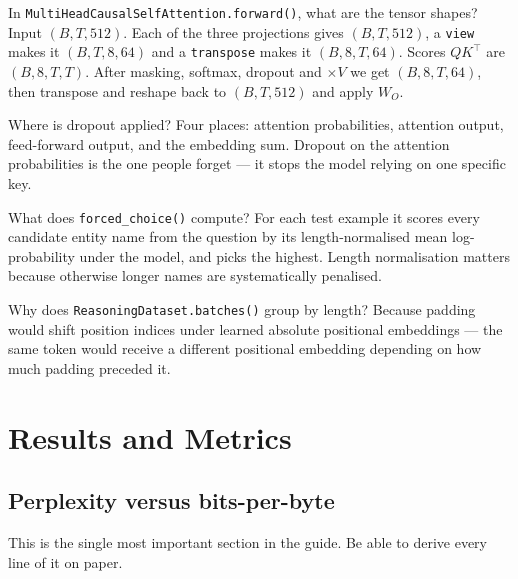\documentclass[11pt]{report}
\begin{document}
\begin{qabox}{In \texttt{MultiHeadCausalSelfAttention.forward()}, what are the tensor shapes?}
Input $(B, T, 512)$. Each of the three projections gives $(B, T, 512)$, a
\texttt{view} makes it $(B, T, 8, 64)$ and a \texttt{transpose} makes it
$(B, 8, T, 64)$. Scores $QK^{\top}$ are $(B, 8, T, T)$. After masking, softmax,
dropout and $\times V$ we get $(B, 8, T, 64)$, then transpose and reshape back
to $(B, T, 512)$ and apply $W_O$.
\end{qabox}

\begin{qabox}{Where is dropout applied?}
Four places: attention probabilities, attention output, feed-forward output,
and the embedding sum. Dropout on the attention probabilities is the one people
forget --- it stops the model relying on one specific key.
\end{qabox}

\begin{qabox}{What does \texttt{forced\_choice()} compute?}
For each test example it scores every candidate entity name from the question by
its length-normalised mean log-probability under the model, and picks the
highest. Length normalisation matters because otherwise longer names are
systematically penalised.
\end{qabox}

\begin{qabox}{Why does \texttt{ReasoningDataset.batches()} group by length?}
Because padding would shift position indices under learned absolute positional
embeddings --- the same token would receive a different positional embedding
depending on how much padding preceded it.
\end{qabox}

\chapter{Results and Metrics}

\section{Perplexity versus bits-per-byte}

\begin{keypoint}
This is the single most important section in the guide. Be able to derive every
line of it on paper.
\end{keypoint}
\end{document}
